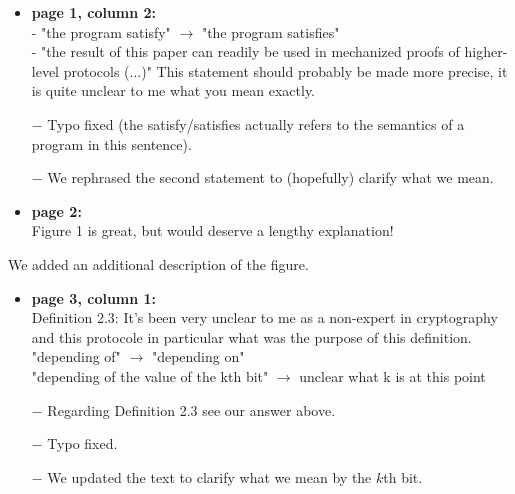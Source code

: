 \begin{itemize}
  \item \textbf{page 1, column 2:}\\
        - "the program satisfy" $\rightarrow$ "the program satisfies"\\
        - "the result of this paper can readily be used in mechanized proofs of higher-level protocols (...)"
        This statement should probably be made more precise, it is quite unclear to me what you mean exactly.
\end{itemize}
\begin{answer}
  \begin{itemize}
    \item[$-$] Typo fixed (the satisfy/satisfies actually refers to the semantics of a program in this sentence).
    \item[$-$]We rephrased the second statement to (hopefully) clarify what we mean.
  \end{itemize}
\end{answer}
\begin{itemize}

  \item \textbf{page 2:}\\
        Figure 1 is great, but would deserve a lengthy explanation!
\end{itemize}
\begin{answer}
  We added an additional description of the figure.
\end{answer}

\begin{itemize}

  \item \textbf{page 3, column 1:}\\
        Definition 2.3: It's been very unclear to me as a non-expert in cryptography and this protocole in particular what was the purpose of this definition.\\
        {\color{gray}"depending of" $\rightarrow$ "depending on"}\\
        "depending of the value of the kth bit" $\rightarrow$ unclear what k is at this point
\end{itemize}
\begin{answer}
  \begin{itemize}
    \item[$-$] Regarding Definition 2.3 see our answer above.
    \item[$-$] Typo fixed.
    \item[$-$] We updated the text to clarify what we mean by the $k$th bit.
  \end{itemize}
\end{answer}


